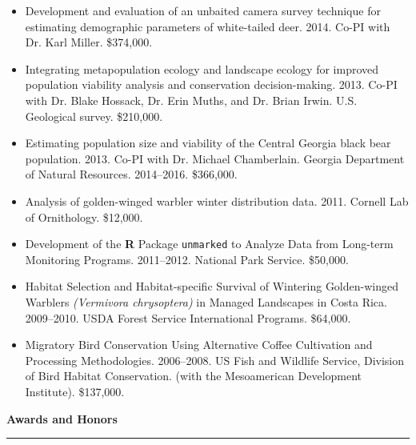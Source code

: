\begin{itemize}
\item Development and evaluation of an unbaited camera survey
  technique for estimating demographic parameters of white-tailed
  deer. 2014. Co-PI with Dr. Karl Miller. \$374,000.  

\item Integrating metapopulation ecology and landscape ecology for
  improved population viability analysis and conservation
  decision-making. 2013. Co-PI with Dr. Blake Hossack, Dr. Erin Muths, and
  Dr. Brian Irwin. U.S. Geological survey. \$210,000.

\item Estimating population size and viability of the Central Georgia
  black bear population. 2013. Co-PI with Dr. Michael
  Chamberlain. Georgia Department of Natural
  Resources. 2014--2016. \$366,000. 

\item Analysis of golden-winged warbler winter distribution
  data. 2011. Cornell Lab of Ornithology. \$12,000. 

\item Development of the {\bf R} Package {\tt unmarked} to Analyze
  Data from Long-term Monitoring Programs. 2011--2012. National Park
  Service. \$50,000. 

\item Habitat Selection and Habitat-specific Survival of Wintering
  Golden-winged Warblers {\it (Vermivora chrysoptera)} in Managed Landscapes
  in Costa Rica. 2009--2010. USDA Forest Service International
  Programs. \$64,000. 

\item Migratory Bird Conservation Using Alternative Coffee
  Cultivation and Processing Methodologies. 2006--2008.  US Fish and
  Wildlife Service, Division of Bird Habitat Conservation. (with
  the Mesoamerican Development Institute). \$137,000.

\end{itemize}


\vspace{0.5cm}



{\large \bf Awards and Honors} \\
\rule[3mm]{\textwidth}{0.3mm}

